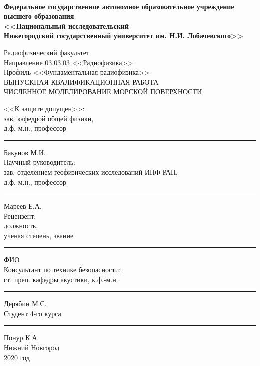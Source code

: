 \documentclass[a4paper,14pt]{extarticle}
\begin{document}
\begin{titlepage}
\begin{spacing}{1}
	\fontsize{11pt}{11pt} \selectfont
	{\centering
	\linespread{1}
	\\[13pt]
	\begin{spacing}{1.5}
		{\fontsize{12pt}{12pt} \selectfont\bf  Федеральное государственное автономное образовательное учреждение \\[-0.27em]
		высшего образования \\[-0.3em]
		<<Национальный исследовательский \\[-0.72em] Нижегородский
		государственный университет им. Н.И. Лобачевского>>
		}\\[4.5pt] 
	\end{spacing}
	\fontsize{12pt}{12pt} \selectfont
	Радиофизический факультет\\[16pt]
	Направление 03.03.03 <<Радиофизика>>\\[5pt]
	Профиль <<Фундаментальная радиофизика>>\\
	\vspace{30pt}
	ВЫПУСКНАЯ КВАЛИФИКАЦИОННАЯ РАБОТА\\
	\vspace{34pt}
	{{
            ЧИСЛЕННОЕ МОДЕЛИРОВАНИЕ МОРСКОЙ ПОВЕРХНОСТИ
	}}\\
	\vspace{34pt}}\fontsize{12pt}{12pt} \selectfont
	\noindent <<К защите допущен>>:\\[15pt]
	зав. кафедрой общей физики,\\[0.4em]
	д.ф.-м.н., профессор\hfill \rule{2cm}{1pt} Бакунов М.И. \hphantom{a\!a}\\[15pt]
	Научный руководитель:\\[0.4em]
	зав. отделением геофизических исследований ИПФ РАН,\\[0.4em] д.ф.-м.н., профессор\hfill \rule{2cm}{1pt} Мареев Е.А. \hphantom{aaa\,}\\[15pt]
	Рецензент:\\[0.4em]
	должность,\\[0.4em] ученая степень, звание\hfill \rule{2cm}{1pt} ФИО\hphantom{aaaaaaaaaa,}\\[30pt]
	Консультант по технике безопасности:\\[0.4em]
	ст. преп. кафедры акустики, к.ф.-м.н.\hfill \rule{2cm}{1pt} Дерябин М.С.\hphantom{aa,}\\[15pt]
	Студент 4-го курса \hfill \rule{1.9cm}{1pt} Понур К.А. \hphantom{\,\,}\\[15pt]
	\vfill
	\centering
	Нижний Новгород\\[0.4em]
	2020 год
\end{spacing}
\end{titlepage}
\end{document}

